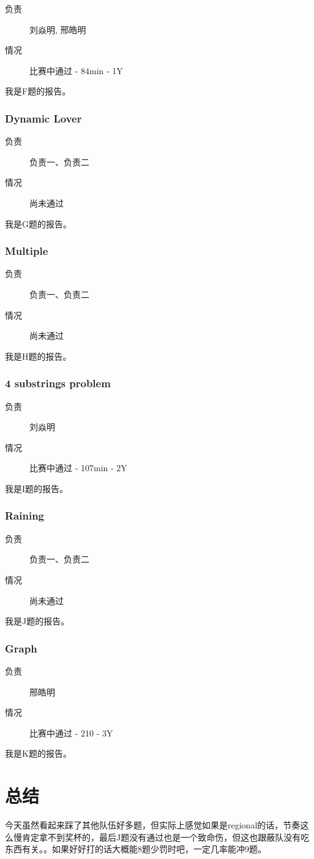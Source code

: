 \documentclass[a4paper, 11pt, nofonts, nocap, fancyhdr]{ctexart}
\newcommand{\problem}[1]{\subsubsection{#1}}
\begin{document}
\begin{description}
\item[负责] 刘焱明, 邢皓明
\item[情况] 比赛中通过 - 84min - 1Y
\end{description}

我是F题的报告。

\problem{Dynamic Lover}

\begin{description}
\item[负责] 负责一、负责二
\item[情况] 尚未通过
\end{description}

我是G题的报告。


\problem{Multiple}

\begin{description}
\item[负责] 负责一、负责二
\item[情况] 尚未通过
\end{description}

我是H题的报告。

\problem{4 substrings problem}

\begin{description}
\item[负责] 刘焱明
\item[情况] 比赛中通过 - 107min - 2Y
\end{description}

我是I题的报告。

\problem{Raining}

\begin{description}
\item[负责] 负责一、负责二
\item[情况] 尚未通过
\end{description}

我是J题的报告。

\problem{Graph}

\begin{description}
\item[负责] 邢皓明
\item[情况] 比赛中通过 - 210 - 3Y
\end{description}

我是K题的报告。

\section{总结}

今天虽然看起来踩了其他队伍好多题，但实际上感觉如果是regional的话，节奏这么慢肯定拿不到奖杯的，最后J题没有通过也是一个致命伤，但这也跟蔽队没有吃东西有关。。如果好好打的话大概能8题少罚时吧，一定几率能冲9题。
\end{document}
